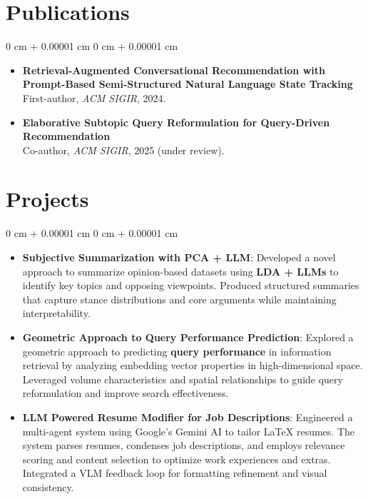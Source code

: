 \documentclass[10pt, letterpaper]{article}
\newenvironment{highlights}{
    \begin{itemize}[
        topsep=0.10 cm,
        parsep=0.10 cm,
        partopsep=0pt,
        itemsep=0pt,
        leftmargin=0 cm + 10pt
    ]
}{
    \end{itemize}
}
\newenvironment{onecolentry}{
    \begin{adjustwidth}{
        0 cm + 0.00001 cm
    }{
        0 cm + 0.00001 cm
    }
}{
    \end{adjustwidth}
}
\begin{document}
\section{Publications}
\begin{onecolentry}
    \begin{highlights}
    \item \textbf{Retrieval-Augmented Conversational Recommendation with Prompt-Based Semi-Structured Natural Language State Tracking} \\
    First-author, \textit{ACM SIGIR}, 2024. 

    \item \textbf{Elaborative Subtopic Query Reformulation for Query-Driven Recommendation} \\
    Co-author, \textit{ACM SIGIR}, 2025 (under review). %
    \end{highlights}
\end{onecolentry}


\section{Projects}
\vspace{0.10 cm}
\begin{onecolentry}
    \begin{highlights}
        \item \textbf{Subjective Summarization with PCA + LLM}: Developed a novel approach to summarize opinion-based datasets using \textbf{LDA + LLMs} to identify key topics and opposing viewpoints. Produced structured summaries that capture stance distributions and core arguments while maintaining interpretability.
        \item \textbf{Geometric Approach to Query Performance Prediction}: Explored a geometric approach to predicting \textbf{query performance} in information retrieval by analyzing embedding vector properties in high-dimensional space. Leveraged volume characteristics and spatial relationships to guide query reformulation and improve search effectiveness.
        \item \textbf{LLM Powered Resume Modifier for Job Descriptions}: Engineered a multi-agent system using Google's Gemini AI to tailor LaTeX resumes. The system parses resumes, condenses job descriptions, and employs relevance scoring and content selection to optimize work experiences and extras. Integrated a VLM feedback loop for formatting refinement and visual consistency.
    \end{highlights}
\end{onecolentry}
\end{document}
